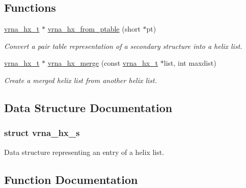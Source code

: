 \subsection*{Functions}
\begin{DoxyCompactItemize}
\item 
\hyperlink{group__struct__utils__helix__list_ga877363f3a1703b53ecd025c6fcf897a0}{vrna\+\_\+hx\+\_\+t} $\ast$ \hyperlink{group__struct__utils__helix__list_ga7ca60670fbbf23ae2ac9f63e5dbf8aef}{vrna\+\_\+hx\+\_\+from\+\_\+ptable} (short $\ast$pt)
\begin{DoxyCompactList}\small\item\em Convert a pair table representation of a secondary structure into a helix list. \end{DoxyCompactList}\item 
\mbox{\label{group__struct__utils__helix__list_ga2fdaac8bb6c239c119ad5c20b145b7f2}} 
\hyperlink{group__struct__utils__helix__list_ga877363f3a1703b53ecd025c6fcf897a0}{vrna\+\_\+hx\+\_\+t} $\ast$ \hyperlink{group__struct__utils__helix__list_ga2fdaac8bb6c239c119ad5c20b145b7f2}{vrna\+\_\+hx\+\_\+merge} (const \hyperlink{group__struct__utils__helix__list_ga877363f3a1703b53ecd025c6fcf897a0}{vrna\+\_\+hx\+\_\+t} $\ast$list, int maxdist)
\begin{DoxyCompactList}\small\item\em Create a merged helix list from another helix list. \end{DoxyCompactList}\end{DoxyCompactItemize}


\subsection{Data Structure Documentation}
\label{structvrna__hx__s}
\subsubsection{struct vrna\+\_\+hx\+\_\+s}
Data structure representing an entry of a helix list. 

\subsection{Function Documentation}
\mbox{\label{group__struct__utils__helix__list_ga7ca60670fbbf23ae2ac9f63e5dbf8aef}} 
